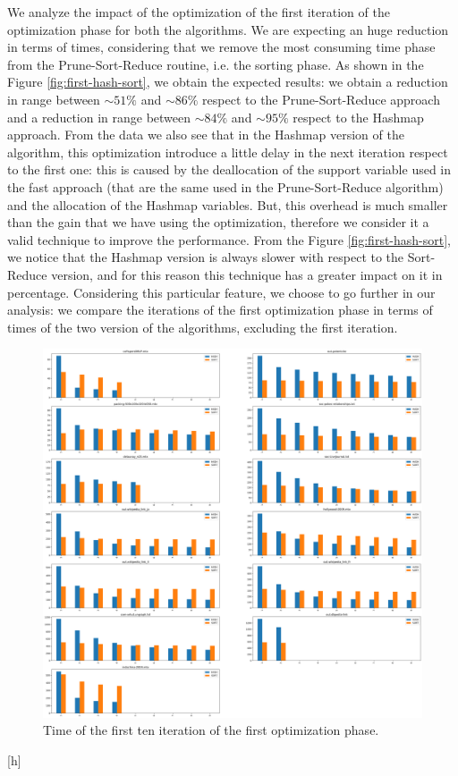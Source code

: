 We analyze the impact of the optimization of the first iteration of the optimization phase for both the algorithms. We are expecting an huge reduction in terms of times, considering that we remove the most consuming time phase from the Prune-Sort-Reduce routine, i.e. the sorting phase. As shown in the Figure \ref{fig:first-hash-sort}, we obtain the expected results: we obtain a reduction in range between $\sim 51\%$ and $\sim 86\%$ respect to the Prune-Sort-Reduce approach and a reduction in range between $\sim 84\%$ and $\sim 95\%$ respect to the Hashmap approach. From the data we also see that in the Hashmap version of the algorithm, this optimization introduce a little delay in the next iteration respect to the first one: this is caused by the deallocation of the support variable used in the fast approach (that are the same used in the Prune-Sort-Reduce algorithm) and the allocation of the Hashmap variables. But, this overhead is much smaller than the gain that we have using the optimization, therefore we consider it a valid technique to improve the performance.
From the Figure \ref{fig:first-hash-sort}, we notice that the Hashmap version is always slower with respect to the Sort-Reduce version, and for this reason this technique has a greater impact on it in percentage. Considering this particular feature, we choose to go further in our analysis: we compare the iterations of the first optimization phase in terms of times of the two version of the algorithms, excluding the first iteration.
\begin{figure}[h]
	\centering
	\includegraphics[width=1\linewidth]{0-resources/hash-vs-sort}
	\caption{Time of the first ten iteration of the first optimization phase.}
	\label{fig:hash-vs-sort}
\end{figure}[h]
